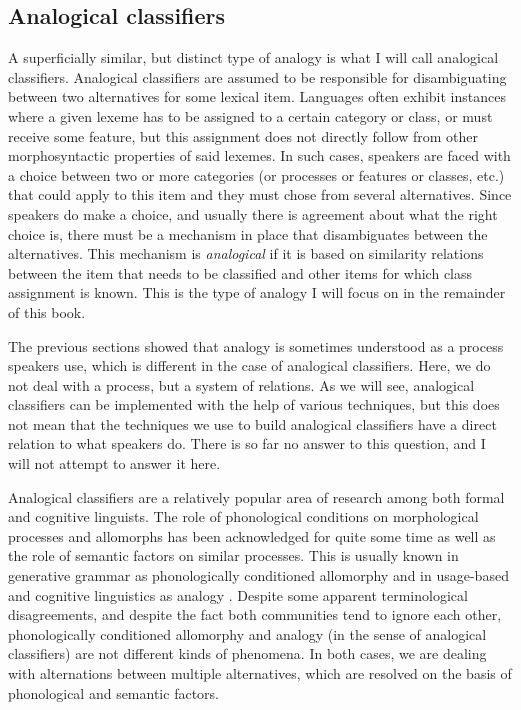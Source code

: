 
\subsection{Analogical classifiers}
  
A superficially similar, but distinct type of analogy is what I will call analogical classifiers. Analogical classifiers are assumed to be responsible for disambiguating between two alternatives for some lexical item. Languages often exhibit instances where a given lexeme has to be assigned to a certain category or class, or must receive some feature, but this assignment does not directly follow from other morphosyntactic properties of said lexemes. In such cases, speakers are faced with a choice between two or more categories (or processes or features or classes, etc.) that could apply to this item and they must chose from several alternatives. Since speakers do make a choice, and usually there is agreement about what the right choice is, there must be a mechanism in place that disambiguates between the alternatives. This mechanism is \textit{analogical} if it is based on similarity relations between the item that needs to be classified and other items for which class assignment is known. This is the type of analogy I will focus on in the remainder of this book.

The previous sections showed that analogy is sometimes understood as a process speakers use, which is different in the case of analogical classifiers. Here, we do not deal with a process, but a system of relations. As we will see, analogical classifiers can be implemented with the help of various techniques, but this does not mean that the techniques we use to build analogical classifiers have a direct relation to what speakers do. There is so far no answer to this question, and I will not attempt to answer it here.

Analogical classifiers are a relatively popular area of research among both formal and cognitive linguists. The role of phonological conditions on morphological processes and allomorphs has been acknowledged for quite some time \autocites{Kurylowicz.1945, Bybee.1982, Carstairs.1990} as well as the role of semantic factors \autocite{Malkiel.1988} on similar processes. This is usually known in generative grammar as phonologically conditioned allomorphy \autocite{Nevins.2011a} and in usage-based and cognitive linguistics as analogy \autocite{Bybee.1982}. Despite some apparent terminological disagreements, and despite the fact both communities tend to ignore each other, phonologically conditioned allomorphy and analogy (in the sense of analogical classifiers) are not different kinds of phenomena. In both cases, we are dealing with alternations between multiple alternatives, which are resolved on the basis of phonological and semantic factors.


